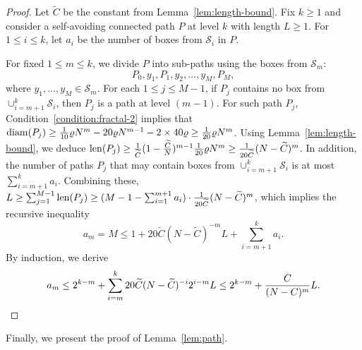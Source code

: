 \documentclass[a4paper]{article}
\numberwithin{equation}{section}
\numberwithin{equation}{section}
\renewcommand{\1}{\mathbf{1}}
\begin{document}
\begin{proof}
    Let $\widetilde C$ be the constant from Lemma~\ref{lem:length-bound}. Fix $k \geq 1$ and consider a self-avoiding connected path $P$ at level $k$ with length $L \geq 1$. For $1 \leq i \leq k$, let $a_i$ be the number of boxes from $\mathcal{S}_i$ in $P$.
    
    For fixed $1 \leq m \leq k$, we divide $P$ into sub-paths using the boxes from $\mathcal{S}_m$:
    $$ P_0, y_1, P_1, y_2, \ldots, y_M, P_M, $$
    where $y_1,\ldots,y_M \in \mathcal{S}_m$. For each $1 \leq j \leq M-1$, if $P_j$ contains no box from $\cup_{i=m+1}^k \mathcal{S}_i$, then $P_j$ is a path at level $(m-1)$. For such path $P_j$, Condition~\ref{condition:fractal-2} implies that ${\rm diam}(P_j) \geq \frac{1}{10} \varrho N^m - 20  \varrho  N^{m-1} - 2 \times 40  \varrho  \geq \frac{1}{20}  \varrho  N^m$. Using Lemma~\ref{lem:length-bound}, we deduce ${\rm len}(P_j) \geq \frac{1}{\widetilde C} ( 1 - \frac{\widetilde C}{N})^{m-1} \frac{1}{20} \varrho N^m \geq \frac{1}{20 \widetilde C} ( N - \widetilde C)^m$. In addition, the number of paths $P_j$ that may contain boxes from $\cup_{i=m+1}^k \mathcal{S}_i$ is at most $\sum_{i = m+1}^k a_i$. Combining these, $L \ge \sum_{j=1}^{M-1} {\rm len}(P_j) \ge (M-1-\sum_{i=1}^{m+1}a_i) \cdot \tfrac{1}{20 \widetilde C} ( N - \widetilde C)^m$, which implies the recursive inequality
    \[ a_m = M \leq 1 + 20 \widetilde C ( N - \widetilde C)^{-m} L + \sum_{i=m+1}^k a_i. \]
    By induction, we derive
    \[ a_m \leq 2^{k-m} + \sum_{i=m}^k 20 \widetilde C ( N - \widetilde C)^{-i} 2^{i-m} L \leq 2^{k-m} + \frac{C}{(N-C)^m} L. \qedhere \]
\end{proof}

Finally, we present the proof of Lemma~\ref{lem:path}.
\end{document}

